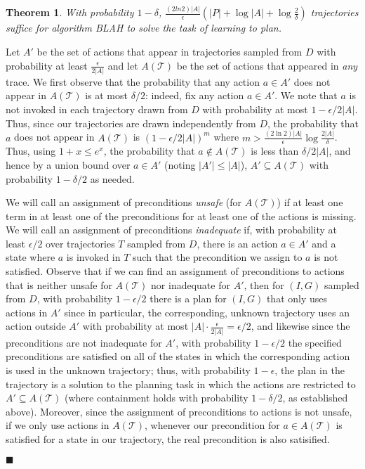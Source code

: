 \documentclass[letterpaper]{article}
\newenvironment{proof}{\noindent{\bf Proof:~~}}{\qed}
\newcommand{\qed}{\hfill\ensuremath{\blacksquare}}
\newtheorem{theorem}{Theorem}
\begin{document}
\begin{theorem}
With probability $1-\delta$, $\frac{(2ln 2)|A|}{\epsilon}(|P|+\log |A|+\log\frac{2}{\delta})$ trajectories suffice for algorithm BLAH to solve the task of learning to plan.
\end{theorem}
\begin{proof}
Let $A'$ be the set of actions that appear in trajectories sampled from $D$ with probability at least $\frac{\epsilon}{2|A|}$%
and let $A(\mathcal{T})$ be the set of actions that appeared in {\em any} trace. 
We first observe that the probability that any action $a\in A'$ does not appear in $A(\mathcal{T})$ is at most $\delta/2$: indeed, fix any action $a\in A'$. We note that $a$ is not invoked in each trajectory drawn from $D$ with probability at most $1-\epsilon/2|A|$. Thus, since our trajectories are drawn independently from $D$, the probability that $a$ does not appear in $A(\mathcal{T})$ is $(1-\epsilon/2|A|)^m$ where $m > \frac{(2\ln 2)|A|}{\epsilon}\log\frac{2|A|}{\delta}$. Thus, using $1+x\leq e^x$, the probability that $a\notin A(\mathcal{T})$ is less than $\delta/2|A|$, and hence by a union bound over $a\in A'$ (noting $|A'|\leq |A|$), $A'\subseteq A(\mathcal{T})$ with probability $1-\delta/2$ as needed.

We will call an assignment of preconditions {\em unsafe} (for $A(\mathcal{T})$) if at least one term in at least one of the preconditions for at least one of the actions is missing. We will call an assignment of preconditions {\em inadequate} if, with probability at least $\epsilon/2$ over trajectories $T$ sampled from $D$, there is an action $a\in A'$ and a state where $a$ is invoked in $T$ such that the precondition we assign to $a$ is not satisfied.  Observe that if we can find an assignment of preconditions to actions that is neither unsafe for $A(\mathcal{T})$ nor inadequate for $A'$, then for $(I,G)$ sampled from $D$, with probability $1-\epsilon/2$ there is a plan for $(I,G)$ that only uses actions in $A'$ since in particular, the corresponding, unknown trajectory uses an action outside $A'$ with probability at most $|A|\cdot\frac{\epsilon}{2|A|}=\epsilon/2$, and likewise since the preconditions are not inadequate for $A'$, with probability $1-\epsilon/2$ the specified preconditions are satisfied on all of the states in which the corresponding action is used in the unknown trajectory; thus, with probability $1-\epsilon$, the plan in the trajectory is a solution to the planning task in which the actions are restricted to $A'\subseteq A(\mathcal{T})$ (where containment holds with probability $1-\delta/2$, as established above). Moreover, since the assignment of preconditions to actions is not unsafe, if we only use actions in $A(\mathcal{T})$, whenever our precondition for $a\in A(\mathcal{T})$ is satisfied for a state in our trajectory, the real precondition is also satisified. 


\end{proof}
\end{document}
